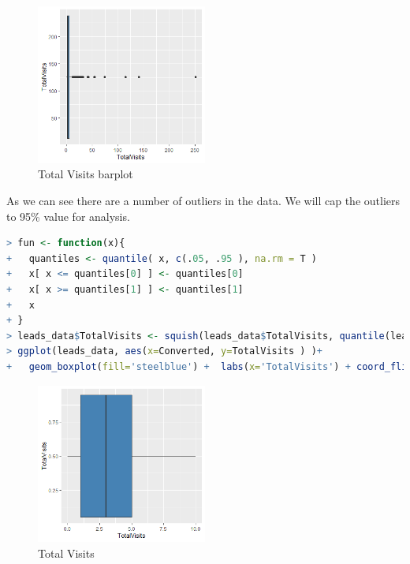 \begin{figure}[H]
		\centering
    \includegraphics[width=0.5\textwidth]{assets/visit.png}
    \caption{Total Visits barplot}	
\end{figure}
As we can see there are a number of outliers in the data.
We will cap the outliers to 95\% value for analysis.
\begin{lstlisting}[language=R]
> fun <- function(x){
+   quantiles <- quantile( x, c(.05, .95 ), na.rm = T )
+   x[ x <= quantiles[0] ] <- quantiles[0]
+   x[ x >= quantiles[1] ] <- quantiles[1]
+   x
+ }
> leads_data$TotalVisits <- squish(leads_data$TotalVisits, quantile(leads_data$TotalVisits, c(.05, .95), na.rm = T))
> ggplot(leads_data, aes(x=Converted, y=TotalVisits ) )+
+   geom_boxplot(fill='steelblue') +  labs(x='TotalVisits') + coord_flip()
\end{lstlisting}
\begin{figure}[H]
		\centering
    \includegraphics[width=0.5\textwidth]{assets/visi.png}
    \caption{Total Visits}	
\end{figure}

